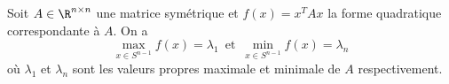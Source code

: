 


\begin{theorem}
  \label{thr:18}
  Soit $A \in \R^{n\times n}$ une matrice symétrique et $f(x) = x^TAx$ la forme quadratique correspondante à $A$. On a
  \begin{equation}
    \label{eq:11}
    \max_{x \in S^{n-1}} f(x) = \lambda_1  \, \text{ et } \,  \min_{x \in S^{n-1}} f(x)  = \lambda_n
  \end{equation}
  où $\lambda_1$ et $\lambda_n$ sont les valeurs propres maximale et minimale de $A$ respectivement. 
\end{theorem}

